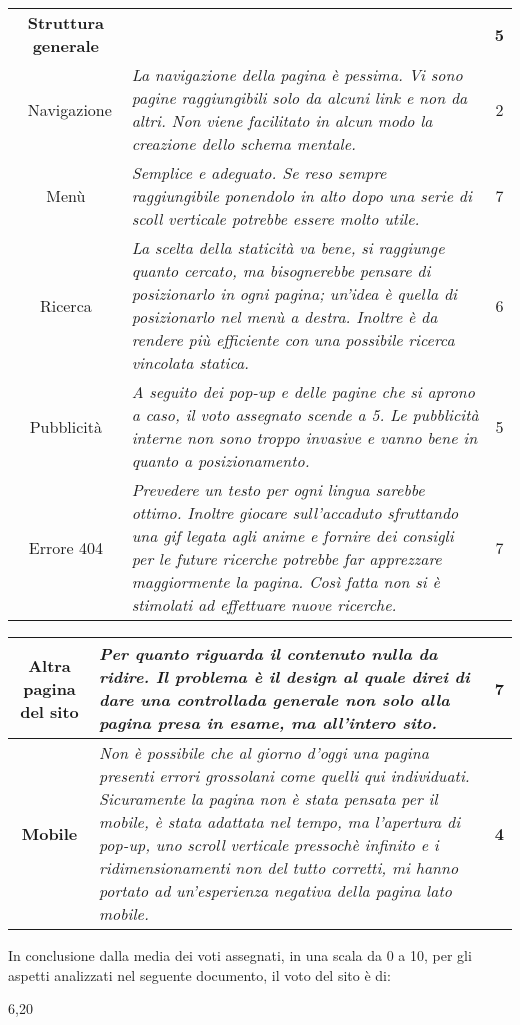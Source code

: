 \begin{center}
\begin{tabularx}{\textwidth}{|c|X|c|}
		\textbf{Struttura generale} &	&	\textbf{5}\\
		\hdashline 
		\multirow{5}{0cm}\
		Navigazione & \textit{La navigazione della pagina è pessima. Vi sono pagine raggiungibili solo da alcuni link e non da altri. Non viene facilitato in alcun modo la creazione dello schema mentale.} &	2\\
		Menù		& \textit{Semplice e adeguato. Se reso sempre raggiungibile ponendolo in alto dopo una serie di scoll verticale potrebbe essere molto utile.} &	7\\
		Ricerca 	& \textit{La scelta della staticità va bene, si raggiunge quanto cercato, ma bisognerebbe pensare di posizionarlo in ogni pagina; un'idea è quella di posizionarlo nel menù a destra. Inoltre è da rendere più efficiente con una possibile ricerca vincolata statica.} &	6\\
		Pubblicità 	& \textit{A seguito dei pop-up e delle pagine che si aprono a caso, il voto assegnato scende a 5. Le pubblicità interne non sono troppo invasive e vanno bene in quanto a posizionamento.} &	5\\
		Errore 404	& \textit{Prevedere un testo per ogni lingua sarebbe ottimo. Inoltre giocare sull'accaduto sfruttando una gif legata agli anime e fornire dei consigli per le future ricerche potrebbe far apprezzare maggiormente la pagina. Così fatta non si è stimolati ad effettuare nuove ricerche.}	&	7\\
		\hline
		
	\end{tabularx}
\newpage
	\begin{tabularx}{\textwidth}{|c|X|c|}
		 
		\textbf{Altra pagina del sito} 	& \textit{Per quanto riguarda il contenuto nulla da ridire. Il problema è il design al quale direi di dare una controllada generale non solo alla pagina presa in esame, ma all'intero sito.} & \textbf{7} \\ \hline
		
		\textbf{Mobile} & \textit{Non è possibile che al giorno d'oggi una pagina presenti errori grossolani come quelli qui individuati. Sicuramente la pagina non è stata pensata per il mobile, è stata adattata nel tempo, ma l'apertura di pop-up, uno scroll verticale pressochè infinito e i ridimensionamenti non del tutto corretti, mi hanno portato ad un'esperienza negativa della pagina lato mobile.} & \textbf{4} \\ \hline
		
	\end{tabularx}

\end{center}

In conclusione dalla media dei voti assegnati, in una scala da 0 a 10, per gli aspetti analizzati nel seguente documento, il voto del sito è di: \\
\begin{center}
	\LARGE 6,20
\end{center}
